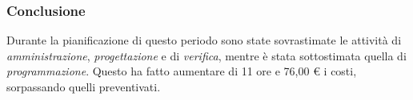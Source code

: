 \subsubsection{Conclusione}
Durante la pianificazione di questo periodo sono state sovrastimate le attivit\`a di \textit{amministrazione}, \textit{progettazione} e di \textit{verifica}, mentre \`e stata sottostimata quella di \textit{programmazione}.
Questo ha fatto aumentare di 11 ore e 76,00 \euro{} i costi, sorpassando quelli preventivati.
